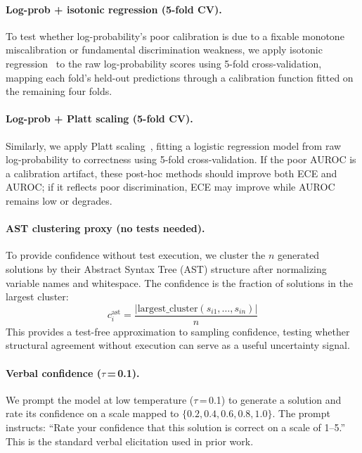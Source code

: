 \documentclass{article}
\begin{document}
\paragraph{Log-prob + isotonic regression (5-fold CV).}
To test whether log-probability's poor calibration is due to a fixable monotone miscalibration or fundamental discrimination weakness, we apply isotonic regression~\citep{zadrozny2002transforming} to the raw log-probability scores using 5-fold cross-validation, mapping each fold's held-out predictions through a calibration function fitted on the remaining four folds.

\paragraph{Log-prob + Platt scaling (5-fold CV).}
Similarly, we apply Platt scaling~\citep{platt1999probabilistic}, fitting a logistic regression model from raw log-probability to correctness using 5-fold cross-validation. If the poor AUROC is a calibration artifact, these post-hoc methods should improve both ECE and AUROC; if it reflects poor discrimination, ECE may improve while AUROC remains low or degrades.

\paragraph{AST clustering proxy (no tests needed).}
To provide confidence without test execution, we cluster the $n$ generated solutions by their Abstract Syntax Tree (AST) structure after normalizing variable names and whitespace. The confidence is the fraction of solutions in the largest cluster:
\begin{equation}
  c_i^{\text{ast}} = \frac{|\text{largest\_cluster}(s_{i1}, \ldots, s_{in})|}{n}
  \label{eq:ast}
\end{equation}
This provides a test-free approximation to sampling confidence, testing whether structural agreement without execution can serve as a useful uncertainty signal.

\paragraph{Verbal confidence ($\tau$\,=\,0.1).}
We prompt the model at low temperature ($\tau$\,=\,0.1) to generate a solution and rate its confidence on a scale mapped to $\{0.2, 0.4, 0.6, 0.8, 1.0\}$. The prompt instructs: ``Rate your confidence that this solution is correct on a scale of 1--5.'' This is the standard verbal elicitation used in prior work.
\end{document}
